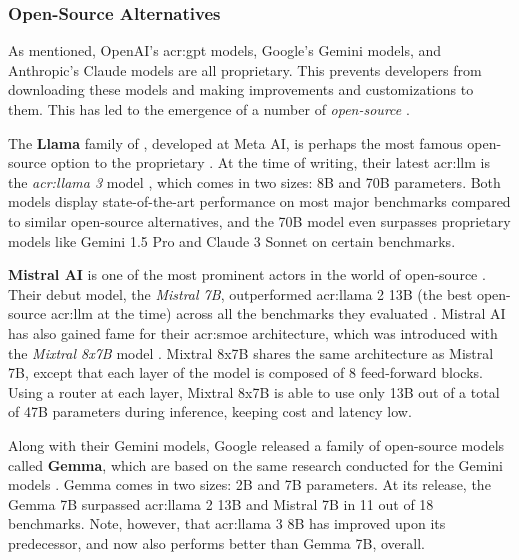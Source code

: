 \subsubsection{Open-Source Alternatives}
\label{subsubsec:open-source-llms}

As mentioned, OpenAI's \acrshort{acr:gpt} models, Google's Gemini models, and Anthropic's Claude models are all proprietary. This prevents developers from downloading these models and making improvements and customizations to them. This has led to the emergence of a number of \textit{open-source} .

The \textbf{Llama} family of , developed at Meta AI, is perhaps the most famous open-source option to the proprietary . At the time of writing, their latest \acrshort{acr:llm} is the \textit{\acrshort{acr:llama} 3} model \citep{metaaiIntroducingMetaLlama2024}, which comes in two sizes: 8B and 70B parameters. Both models display state-of-the-art performance on most major benchmarks compared to similar open-source alternatives, and the 70B model even surpasses proprietary models like Gemini 1.5 Pro and Claude 3 Sonnet on certain benchmarks.

\textbf{Mistral AI} is one of the most prominent actors in the world of open-source . Their debut model, the \textit{Mistral 7B}, outperformed \acrshort{acr:llama} 2 13B (the best open-source \acrshort{acr:llm} at the time) across all the benchmarks they evaluated \citep{jiangMistral7B2023}. Mistral AI has also gained fame for their \gls{acr:smoe} architecture, which was introduced with the \textit{Mixtral 8x7B} model \citep{jiangMixtralExperts2024}. Mixtral 8x7B shares the same architecture as Mistral 7B, except that each layer of the model is composed of 8 feed-forward blocks. Using a router at each layer, Mixtral 8x7B is able to use only 13B out of a total of 47B parameters during inference, keeping cost and latency low.

Along with their Gemini models, Google released a family of open-source models called \textbf{Gemma}, which are based on the same research conducted for the Gemini models \citep{gemmateamGemmaOpenModels2024}. Gemma comes in two sizes: 2B and 7B parameters. At its release, the Gemma 7B surpassed \acrshort{acr:llama} 2 13B and Mistral 7B in 11 out of 18 benchmarks. Note, however, that \acrshort{acr:llama} 3 8B has improved upon its predecessor, and now also performs better than Gemma 7B, overall.


